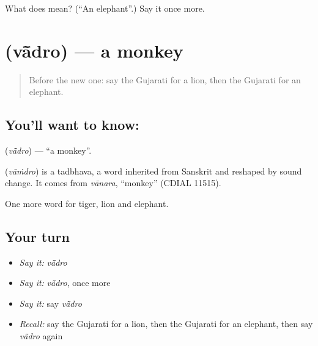 \begin{tcolorbox}[breakable,colback=teal!4,colframe=teal!35!black,title={Before you move on}]
What does  mean? (\textquotedblleft{}An elephant\textquotedblright{}.) Say it once more.
\end{tcolorbox}
\section[\texorpdfstring{\gu{વાંદરો} (vā̃dro)}{વાંદરો (vā̃dro)}]{ (vā̃dro) — a monkey}

\label{lesson:GU-C68-monkey}



\begin{quote}
Before the new one: say the Gujarati for a lion, then the Gujarati for an elephant.
\end{quote}

\subsection*{You'll want to know: }
\textbf{} (\emph{vā̃dro}) — \textquotedblleft{}a monkey\textquotedblright{}.

\begin{cousinweb}
\textbf{} (\emph{vāṁdro}) is a tadbhava, a word inherited from Sanskrit and reshaped by sound change. It comes from \emph{vānara}, \textquotedblleft{}monkey\textquotedblright{} (CDIAL 11515).
\end{cousinweb}

\begin{grammarlens}[title={What you've built}]
One more word for tiger, lion and elephant.
\end{grammarlens}

\subsection*{Your turn}
\begin{itemize}
\raggedright
  \item \emph{Say it:} \emph{vā̃dro}
  \item \emph{Say it:} \emph{vā̃dro}, once more
  \item \emph{Say it:} say \emph{vā̃dro}
  \item \emph{Recall:} say the Gujarati for a lion, then the Gujarati for an elephant, then say \emph{vā̃dro} again
\end{itemize}

